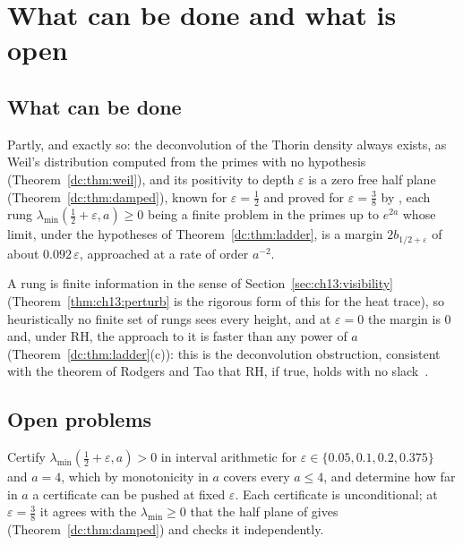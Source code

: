 \section{What can be done and what is open}

\subsection{What can be done}\label{dc:sec:answer}

Partly, and exactly so: the deconvolution of the Thorin density always exists, as Weil's distribution computed from the primes with no hypothesis (Theorem~\ref{dc:thm:weil}), and its positivity to depth $\varepsilon$ is a zero free half plane (Theorem~\ref{dc:thm:damped}), known for $\varepsilon=\frac12$ and proved for $\varepsilon=\frac38$ by \cite{OAI26a}, each rung $\lambda_{\min}(\frac12+\varepsilon,a)\ge0$ being a finite problem in the primes up to $e^{2a}$ whose limit, under the hypotheses of Theorem~\ref{dc:thm:ladder}, is a margin $2b_{1/2+\varepsilon}$ of about $0.092\,\varepsilon$, approached at a rate of order $a^{-2}$.

A rung is finite information in the sense of Section~\ref{sec:ch13:visibility} (Theorem~\ref{thm:ch13:perturb} is the rigorous form of this for the heat trace), so heuristically no finite set of rungs sees every height, and at $\varepsilon=0$ the margin is $0$ and, under RH, the approach to it is faster than any power of $a$ (Theorem~\ref{dc:thm:ladder}(c)): this is the deconvolution obstruction, consistent with the theorem of Rodgers and Tao that RH, if true, holds with no slack~\cite{RodgersTao}.

\subsection{Open problems}\label{dc:sec:open}

\begin{problem}\label{dc:prob:cert}
Certify $\lambda_{\min}(\frac12+\varepsilon,a)>0$ in interval arithmetic for $\varepsilon\in\{0.05,0.1,0.2,0.375\}$ and $a=4$, which by monotonicity in $a$ covers every $a\le4$, and determine how far in $a$ a certificate can be pushed at fixed $\varepsilon$. Each certificate is unconditional; at $\varepsilon=\frac38$ it agrees with the $\lambda_{\min}\ge0$ that the half plane of \cite{OAI26a} gives (Theorem~\ref{dc:thm:damped}) and checks it independently.
\end{problem}

